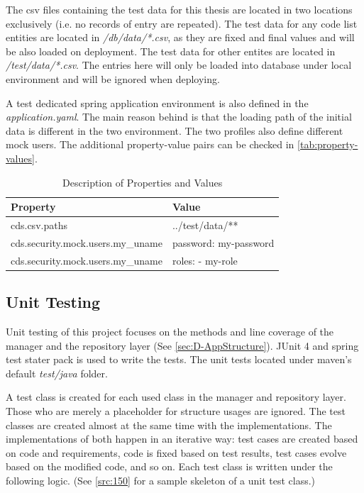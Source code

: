 The csv files containing the test data for this thesis are located in two locations exclusively (i.e. no records of entry are repeated). The test data for any code list entities are located in \textit{/db/data/*.csv}, as they are fixed and final values and will be also loaded on deployment. The test data for other entites are located in \textit{/test/data/*.csv}. The entries here will only be loaded into database under local environment and will be ignored when deploying.

A test dedicated spring application environment is also defined in the \textit{application.yaml}. The main reason behind is that the loading path of the initial data is different in the two environment. The two profiles also define different mock users.
The additional property-value pairs can be checked in \autoref{tab:property-values}.

\begin{table}[ht]
\centering
\begin{tabular}{|l|l|}
\hline
\textbf{Property} & \textbf{Value} \\
\hline
cds.csv.paths & ../test/data/** \\
cds.security.mock.users.my\_uname & password: my-password \\
cds.security.mock.users.my\_uname & roles: - my-role \\
\hline
\end{tabular}
\caption{Description of Properties and Values}
\label{tab:property-values}
\end{table}


\subsection{Unit Testing}
\label{subsec:test-unit}

Unit testing \cite{unit-test} of this project focuses on the methods and line coverage of the manager and the repository layer (See \autoref{sec:D-AppStructure}). JUnit 4 \cite{junit} and spring test \cite{spring-testing} stater pack is used to write the tests. The unit tests located under maven's default \textit{test/java} folder. 

\bigskip
A test class is created for each used class in the manager and repository layer. Those who are merely a placeholder for structure usages are ignored. The test classes are created almost at the same time with the implementations. The implementations of both happen in an iterative way: test cases are created based on code and requirements, code is fixed based on test results, test cases evolve based on the modified code, and so on. Each test class is written under the following logic. (See \autoref{src:150} for a sample skeleton of a unit test class.)

